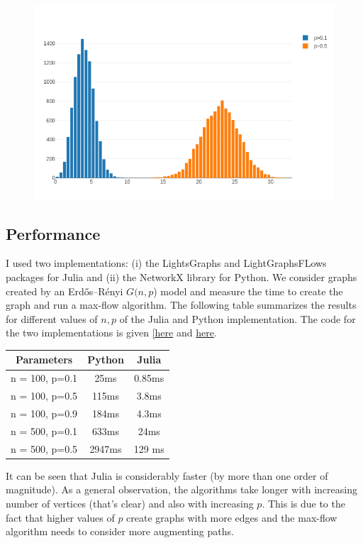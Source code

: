 \begin{figure}[H]
\centering
\includegraphics[scale=0.55]{images/max_flow_04_08.png}
\end{figure}


\subsection{Performance}

I used two implementations: (i) the LightsGraphs and LightGraphsFLows packages for Julia and (ii) the NetworkX library for Python. We consider graphs created by an Erdős–Rényi $G(n,p$) model and measure the time to create the graph and run a max-flow algorithm. The following table summarizes the results for different values of $n, p$ of the Julia and Python implementation. The code for the two implementations is given \href{https://github.com/ClemensFMN/JuliaStuff/blob/master/Graphs/rand_graph_perf.jl}{[here} and \href{https://github.com/ClemensFMN/PythonStuff/blob/master/graphs/max_flow_rand_graph.py}{here}.

\vspace{2mm}

\begin{tabular}{|c|c|c|} \hline
  Parameters & Python & Julia \\ \hline
  n = 100, p=0.1 & 25ms & 0.85ms \\
  n = 100, p=0.5 & 115ms & 3.8ms \\
  n = 100, p=0.9 & 184ms & 4.3ms \\
  n = 500, p=0.1 & 633ms & 24ms \\
  n = 500, p=0.5 & 2947ms &129 ms \\ \hline
\end{tabular}

\vspace{2mm}

It can be seen that Julia is considerably faster (by more than one order of magnitude). As a general observation, the algorithms take longer with increasing number of vertices (that's clear) and also with increasing $p$. This is due to the fact that higher values of $p$ create graphs with more edges and the max-flow algorithm needs to consider more augmenting paths.


